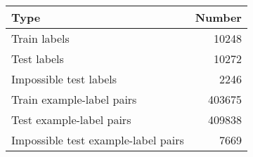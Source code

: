 \begin{tabular}{lr}
\toprule
                                Type &  Number \\
\midrule
                        Train labels &   10248 \\
                         Test labels &   10272 \\
              Impossible test labels &    2246 \\
           Train example-label pairs &  403675 \\
            Test example-label pairs &  409838 \\
 Impossible test example-label pairs &    7669 \\
\bottomrule
\end{tabular}
